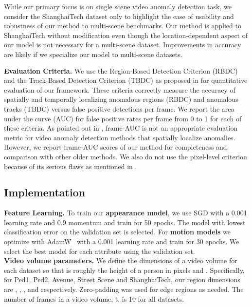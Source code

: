 While our primary focus is on single scene video anomaly detection task, we consider the ShanghaiTech dataset only to highlight the ease of usability and robustness of our method to multi-scene benchmarks. Our method is applied to ShanghaiTech without modification even though the location-dependent aspect of our model is not necessary for a multi-scene dataset.  Improvements in accuracy are likely if we specialize our model to multi-scene datasets.

\textbf{Evaluation Criteria.} We use the Region-Based Detection Criterion (RBDC) and the Track-Based Detection Criterion (TBDC) as proposed in \cite{ramachandra2020street} for quantitative evaluation of our framework.  These criteria correctly measure the accuracy of spatially and temporally localizing anomalous regions (RBDC) and anomalous tracks (TBDC) versus false positive detections per frame.  We report the area under the curve (AUC) for false positive rates per frame from 0 to 1 for each of these criteria. As pointed out in \cite{ramachandra2020street}, frame-AUC \cite{mahadevan2010anomaly} is not an appropriate evaluation  metric for video anomaly detection methods that spatially localize anomalies. However, we report frame-AUC scores of our method for completeness and comparison with other older methods. We also do not use the pixel-level criterion \cite{mahadevan2010anomaly} because of its serious flaws as mentioned in \cite{ramachandra2020street}. 

\subsection{Implementation}

\textbf{Feature Learning.} To train our \textbf{appearance model}, we use SGD with a 0.001 learning rate and 0.9 momentum and train for 50 epochs. The model with lowest classification error on the validation set is selected.  For \textbf{motion models} we optimize with AdamW~\cite{loshchilov2018decoupled} with a 0.001 learning rate and train for 30 epochs. We select the best model for each attribute using the validation set.
\\
\textbf{Video volume parameters.} We define the dimensions  of a video volume for each dataset so that  is roughly the height of a person in pixels and . Specifically, for Ped1, Ped2, Avenue, Street Scene and ShanghaiTech, our region dimensions are , , ,  and  respectively. Zero-padding was used for edge regions as needed. The number of frames in a video volume, t, is 10 for all datasets.

